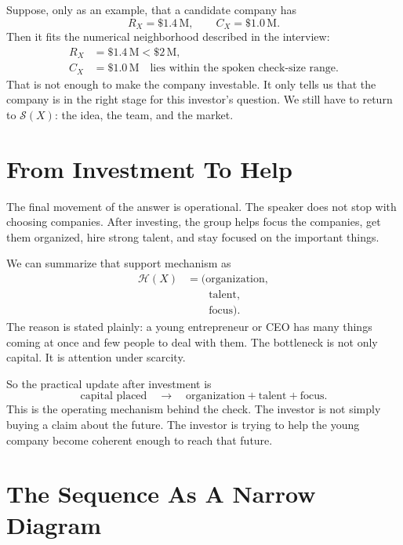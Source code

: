 Suppose, only as an example, that a candidate company has
\begin{equation}
R_X = \$1.4\,\mathrm{M},
\qquad
C_X = \$1.0\,\mathrm{M}.
\end{equation}
Then it fits the numerical neighborhood described in the interview:
\begin{align}
R_X &= \$1.4\,\mathrm{M} < \$2\,\mathrm{M},\\
C_X &= \$1.0\,\mathrm{M}
\quad \text{lies within the spoken check-size range.}
\end{align}
That is not enough to make the company investable. It only tells us that the company is in the right stage for this investor's question. We still have to return to \(\mathcal{S}(X)\): the idea, the team, and the market.

\section{From Investment To Help}

The final movement of the answer is operational. The speaker does not stop with choosing companies. After investing, the group helps focus the companies, get them organized, hire strong talent, and stay focused on the important things.

We can summarize that support mechanism as
\begin{align}
\mathcal{H}(X)
&=
\bigl(
\text{organization}, \nonumber\\
&\qquad
\text{talent}, \nonumber\\
&\qquad
\text{focus}
\bigr).
\end{align}
The reason is stated plainly: a young entrepreneur or CEO has many things coming at once and few people to deal with them. The bottleneck is not only capital. It is attention under scarcity.

So the practical update after investment is
\begin{equation}
\text{capital placed}
\quad \longrightarrow \quad
\text{organization} + \text{talent} + \text{focus}.
\end{equation}
This is the operating mechanism behind the check. The investor is not simply buying a claim about the future. The investor is trying to help the young company become coherent enough to reach that future.

\section{The Sequence As A Narrow Diagram}


